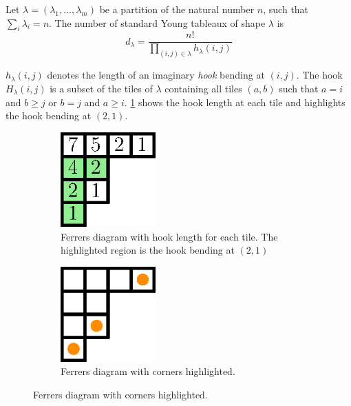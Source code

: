 \begin{theorem}
\label{theorem:xy:lattice:hook}
Let \(\lambda = (\lambda_1,\ldots,\lambda_m)\) be a partition of the natural
number \(n\), \ie such that \(\sum_i \lambda_i = n\). The number of standard
Young tableaux of shape \(\lambda\) is
\begin{displaymath}
d_{\lambda} = \frac{n!}{\prod_{(i,j) \in \lambda} h_{\lambda}(i,j)}
\end{displaymath}
\end{theorem}

\(h_{\lambda}(i,j)\) denotes the length of an imaginary \emph{hook} bending at
\((i,j)\). The hook \(H_{\lambda}(i,j)\) is a subset of the tiles of
\(\lambda\) containing all tiles \((a,b)\) such that \(a = i\) and \(b \ge j\)
or \(b = j\) and \(a \ge i\). \ref{fig:xy:lattice:hooks} shows the hook length
at each tile and highlights the hook bending at \((2,1)\).

\begin{figure}
\centering
\begin{subfigure}[b]{0.49\textwidth}
\centering
	\includegraphics[width=0.4\textwidth]{fig/x+y/lattice/hooks}
	\caption{Ferrers diagram with hook length for each tile. The highlighted
region is the hook bending at \((2,1)\)}
	\label{fig:xy:lattice:hooks}
\end{subfigure}
\begin{subfigure}[b]{0.49\textwidth}
\centering
	\includegraphics[width=0.4\textwidth]{fig/x+y/lattice/corners}
	\caption{Ferrers diagram with corners highlighted.}
	\label{fig:xy:lattice:corners}
\end{subfigure}
\end{figure}

